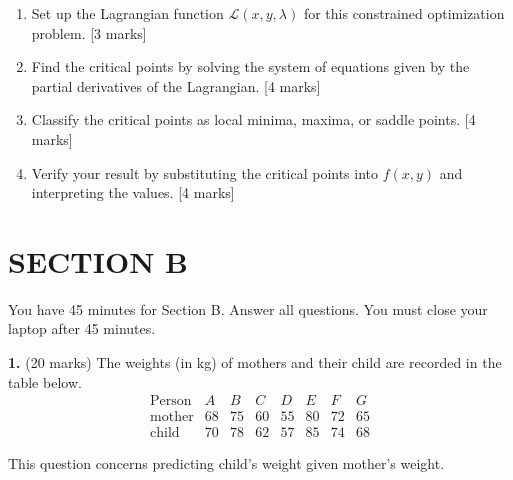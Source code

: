 \documentclass{article}
\begin{document}
\begin{enumerate}[label=(\alph*)]
    \item Set up the Lagrangian function $\mathcal{L}(x,y,\lambda)$ for this constrained optimization problem. [3 marks]

    \item Find the critical points by solving the system of equations given by the partial derivatives of the Lagrangian. [4 marks]

    \item Classify the critical points as local minima, maxima, or saddle points. [4 marks]

    \item Verify your result by substituting the critical points into $f(x, y)$ and interpreting the values. [4 marks]

\end{enumerate}


\newpage
\section*{SECTION B}
You have 45 minutes for Section B. Answer all questions. You must close your laptop after 45 minutes.

\bigskip

\textbf{1.} (20 marks) The weights (in kg) of mothers and their child are recorded in the table below.
\[
\begin{array}{c|ccccccc}
\text{Person} & A & B & C & D & E & F & G\\
\hline
\text{mother} & 68 & 75 & 60 & 55 & 80 & 72 & 65\\
\text{child} & 70 & 78 & 62 & 57 & 85 & 74 & 68
\end{array}
\]

This question concerns predicting child's weight given mother's weight.
\end{document}
